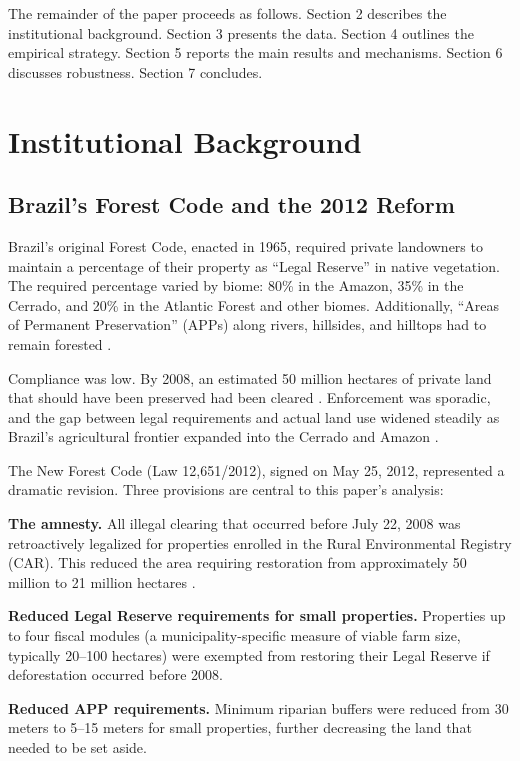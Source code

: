 \documentclass[12pt]{article}
\begin{document}
The remainder of the paper proceeds as follows. Section 2 describes the institutional background. Section 3 presents the data. Section 4 outlines the empirical strategy. Section 5 reports the main results and mechanisms. Section 6 discusses robustness. Section 7 concludes.


\section{Institutional Background}

\subsection{Brazil's Forest Code and the 2012 Reform}

Brazil's original Forest Code, enacted in 1965, required private landowners to maintain a percentage of their property as ``Legal Reserve'' in native vegetation. The required percentage varied by biome: 80\% in the Amazon, 35\% in the Cerrado, and 20\% in the Atlantic Forest and other biomes. Additionally, ``Areas of Permanent Preservation'' (APPs) along rivers, hillsides, and hilltops had to remain forested \citep{sparovek2012brazilian}.

Compliance was low. By 2008, an estimated 50 million hectares of private land that should have been preserved had been cleared \citep{soares2014forest}. Enforcement was sporadic, and the gap between legal requirements and actual land use widened steadily as Brazil's agricultural frontier expanded into the Cerrado and Amazon \citep{gibbs2015brazil}.

The New Forest Code (Law 12,651/2012), signed on May 25, 2012, represented a dramatic revision. Three provisions are central to this paper's analysis:

\textbf{The amnesty.} All illegal clearing that occurred before July 22, 2008 was retroactively legalized for properties enrolled in the Rural Environmental Registry (CAR). This reduced the area requiring restoration from approximately 50 million to 21 million hectares \citep{soares2014forest, brancalion2016critical}.

\textbf{Reduced Legal Reserve requirements for small properties.} Properties up to four fiscal modules (a municipality-specific measure of viable farm size, typically 20--100 hectares) were exempted from restoring their Legal Reserve if deforestation occurred before 2008.

\textbf{Reduced APP requirements.} Minimum riparian buffers were reduced from 30 meters to 5--15 meters for small properties, further decreasing the land that needed to be set aside.
\end{document}

